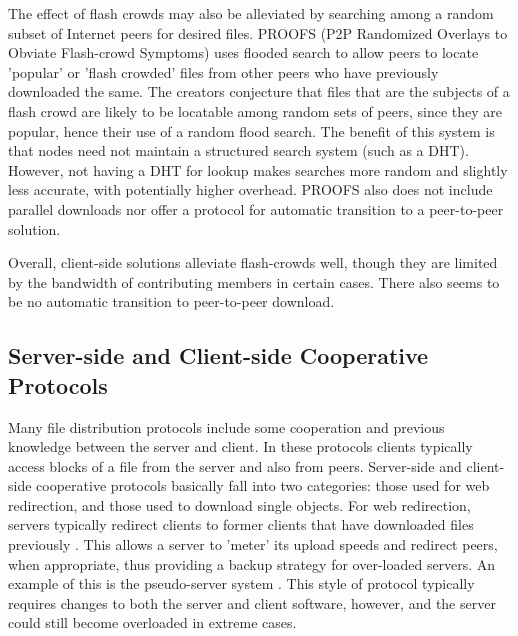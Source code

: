 The effect of  flash crowds may also be alleviated by searching among a random subset of Internet peers for desired files.  PROOFS \cite{proofs} (P2P Randomized Overlays to Obviate Flash-crowd Symptoms) uses flooded search to allow peers to locate 'popular' or 'flash crowded' files from other peers who have previously downloaded the same.  The creators conjecture that files that are the subjects of a flash crowd are likely to be locatable among random sets of peers, since they are popular, hence their use of a random flood search.  The benefit of this system is that nodes need not maintain a structured search system (such as a DHT). However, not having a DHT for lookup makes searches more random and slightly less accurate, with potentially higher overhead.  PROOFS also does not include parallel downloads nor offer a protocol for automatic transition to a peer-to-peer solution.

Overall, client-side solutions alleviate flash-crowds well, though they are limited by the bandwidth of contributing members in certain cases. There also seems to be no automatic transition to peer-to-peer download.

\subsection{Server-side and Client-side Cooperative Protocols} 
Many file distribution protocols include some cooperation and previous knowledge between the server and client.  In these protocols clients typically access blocks of a file from the server and also from peers.  Server-side and client-side cooperative protocols basically fall into two categories: those used for web redirection, and those used to download single objects.  For web redirection, servers typically redirect clients to former clients that have downloaded files previously \cite{pseudoserving, coopnet}.  This allows a server to 'meter' its upload speeds and redirect peers, when appropriate, thus providing a backup strategy for over-loaded servers.  An example of this is the pseudo-server system \cite{pseudoserving}.  This style of protocol typically requires changes to both the server and client software, however, and the server could still become overloaded in extreme cases.


